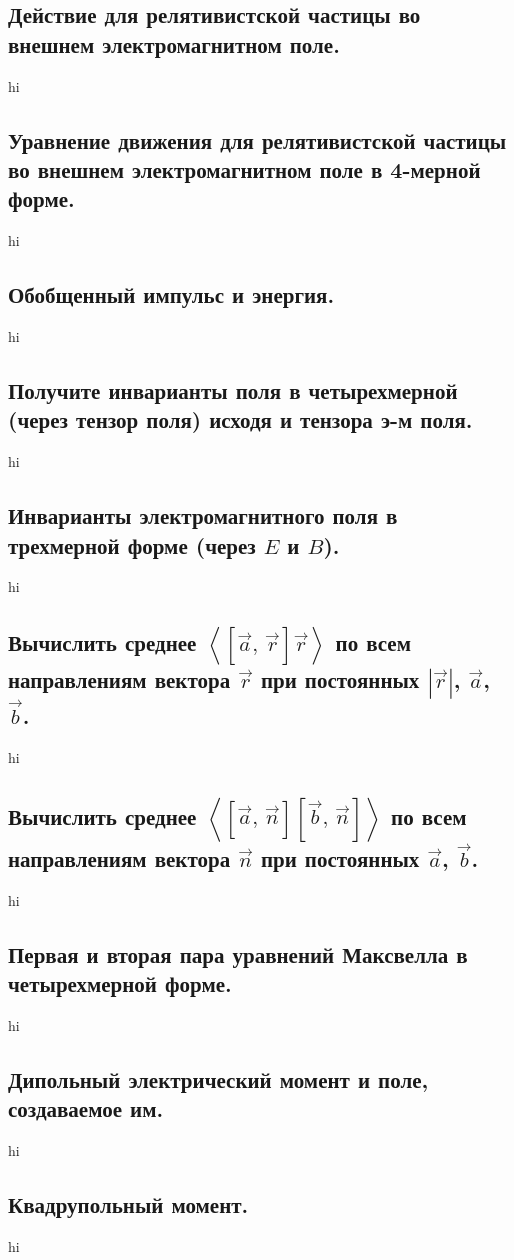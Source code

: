 \documentclass[a4paper,12pt]{article}
\begin{document}
\subsection{Действие для релятивистской частицы во внешнем электромагнитном
поле.}
hi
\subsection{Уравнение движения для релятивистской частицы во внешнем
электромагнитном поле в 4-мерной форме.}
hi
\subsection{Обобщенный импульс и энергия.}
hi
\subsection{Получите инварианты поля в четырехмерной (через тензор поля)
исходя и тензора э-м поля.}
hi
\subsection{Инварианты электромагнитного поля в трехмерной форме (через $E$ и
$B$).}
hi
\subsection{Вычислить среднее $\left<\left[ \vec{a},\,\vec{r} \right] \vec{r}
\right>$ по всем направлениям вектора $\vec{r}$ при постоянных  $\left| 
\vec{r}\right| $, $\vec{a}$, $\vec{b}$.}
hi
\subsection{Вычислить среднее $\left<\left[ \vec{a},\,\vec{n} \right]
\left[ \vec{b},\,\vec{n} \right]
\right>$ по всем направлениям вектора $\vec{n}$ при постоянных 
$\vec{a}$, $\vec{b}$.}
hi
\subsection{Первая и вторая пара уравнений Максвелла в четырехмерной форме.}
hi
\subsection{Дипольный электрический момент и поле, создаваемое им.}
hi
\subsection{Квадрупольный момент.}
hi
\end{document}
